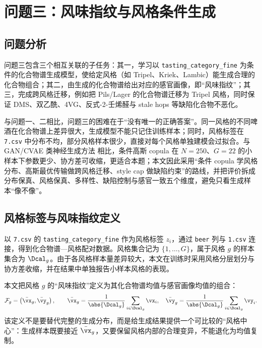 
\section{问题三：风味指纹与风格条件生成}
\label{sec:q3}

\subsection{问题分析}

问题三包含三个相互关联的子任务：其一，学习以 \texttt{tasting\_category\_fine} 为条件的化合物谱生成模型，使给定风格（如 Tripel、Kriek、Lambic）能生成合理的化合物组合；其二，由生成的化合物谱给出对应的感官画像，即“风味指纹”；其三，完成跨风格迁移，例如把 Pils/Lager 的化合物谱迁移为 Tripel 风格，同时保证 DMS、双乙酰、4VG、反式-2-壬烯醛与 stale hops 等缺陷化合物不恶化。

与问题一、二相比，问题三的困难在于“没有唯一的正确答案”。同一风格的不同啤酒在化合物谱上差异很大，生成模型不能只记住训练样本；同时，风格标签在 \texttt{7.csv} 中分布不均，部分风格样本很少，直接对每个风格单独建模会过拟合。与 GAN/CVAE 类神经生成方法\citep{goodfellow2014generative,mirza2014conditional} 相比，条件高斯 copula 在 $N=250$、$G=22$ 的小样本下参数更少、协方差可收缩，更适合本题；本文因此采用“条件 copula 学风格分布、高斯最优传输做跨风格迁移、style cap 做缺陷约束”的路线，并把评价拆成分布保真、风格保真、多样性、缺陷控制与感官一致五个维度，避免只看生成样本“像不像”。

\subsection{风格标签与风味指纹定义}

以 \texttt{7.csv} 的 \texttt{tasting\_category\_fine} 作为风格标签 $z_i$，通过 \texttt{beer} 列与 \texttt{1.csv} 连接，得到化合物谱—风格配对数据。风格集合记为 $\{1,\dots,G\}$，属于风格 $g$ 的样本集合为 $\Dcal_g$。由于各风格样本量差异较大，本文在训练时采用风格分层划分与协方差收缩，并在结果中单独报告小样本风格的表现。

本文把风格 $g$ 的“风味指纹”定义为其化合物谱均值与感官画像均值的组合：
\begin{equation}
  \mathcal{F}_g=\left(\bar{\vx}_g,\bar{\vy}_g\right),\qquad
  \bar{\vx}_g=\frac{1}{\abs{\Dcal_g}}\sum_{i\in\Dcal_g}\vx_i,\quad
  \bar{\vy}_g=\frac{1}{\abs{\Dcal_g}}\sum_{i\in\Dcal_g}\vy_i.
  \label{eq:q3-fingerprint}
\end{equation}
该定义不是要替代完整的生成分布，而是给生成结果提供一个可比较的“风格中心”：生成样本既要接近 $\bar{\vx}_g$，又要保留风格内部的合理变异，不能退化为均值复制。

